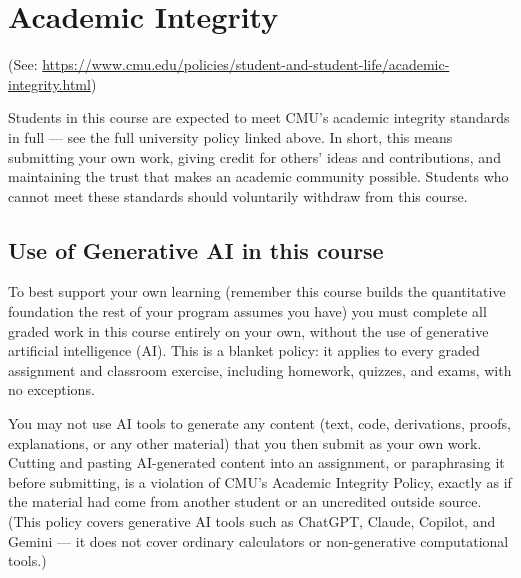\section{Academic Integrity}
\label{sec:cheating}

(See: {\footnotesize\url{https://www.cmu.edu/policies/student-and-student-life/academic-integrity.html}})

Students in this course are expected to meet CMU's academic integrity standards in full ---
see the full university policy linked above. 
In short, this means submitting your own work, giving credit for others' ideas and contributions, 
and maintaining the trust that makes an academic community possible. 
Students who cannot meet these standards should voluntarily withdraw from this course.


\subsection{Use of Generative AI in this course}


To best support your own learning 
(remember this course builds the quantitative foundation the rest of your program assumes you have) 
you must complete all graded work in this course entirely on your own, without the use of generative artificial intelligence (AI). 
This is a blanket policy: it applies to every graded assignment and classroom exercise, including homework, quizzes, and exams, with no exceptions.

You may not use AI tools to generate any content
(text, code, derivations, proofs, explanations, or any other material) that you then submit as your own work. 
Cutting and pasting AI-generated content into an assignment, or paraphrasing it before submitting, is a violation of CMU's Academic Integrity Policy, 
exactly as if the material had come from another student or an uncredited outside source. 
(This policy covers generative AI tools such as ChatGPT, Claude, Copilot, and Gemini — it does not cover ordinary calculators or non-generative computational tools.)

